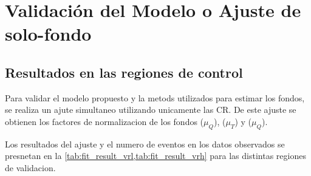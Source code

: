 




\section{Validación del Modelo o Ajuste de solo-fondo} \label{sec:bkgonlyfit}




\subsection{Resultados en las regiones de control}

Para validar el modelo propuesto y la metods utilizados para estimar los fondos,
se realiza un ajute simultaneo utilizando unicamente las CR. De este ajuste se
obtienen los factores de normalizacion de los fondos {\wgam} ($\mu_Q$), {\ttgam}
($\mu_T$) y {\gjet} ($\mu_Q$).


Los resultados del ajuste y el numero de eventos en los datos observados se
presnetan en la \cref{tab:fit_result_vrl,tab:fit_result_vrh} para las distintas
regiones de validacion.

